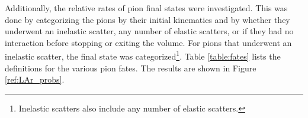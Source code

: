 \documentclass[12pt]{article}
\begin{document}
Additionally, the relative rates of pion final states were investigated. This was done by categorizing the pions by their initial kinematics and by whether they underwent an inelastic scatter, any number of elastic scatters, or if they had no interaction before stopping or exiting the volume. For pions that underwent an inelastic scatter, the final state was categorized\footnote{Inelastic scatters also include any number of elastic scatters.}. Table \ref{table:fates} lists the definitions for the various pion fates. The results are shown in Figure \ref{ref:LAr_probs}. %

\newpage

\end{document}
